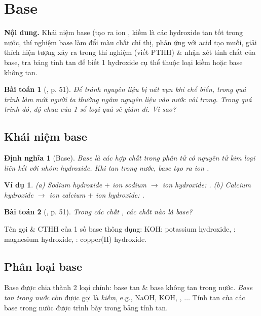 \documentclass{article}
\newtheorem{baitoan}{Bài toán}
\newtheorem{dinhnghia}{Định nghĩa}
\newtheorem{vidu}{Ví dụ}
\begin{document}

\section{Base}
\textsf{\textbf{Nội dung.} Khái niệm base (tạo ra ion , kiềm là các hydroxide tan tốt trong nước, thí nghiệm base làm đổi màu chất chỉ thị, phản ứng với acid tạo muối, giải thích hiện tượng xảy ra trong thí nghiệm (viết PTHH) \& nhận xét tính chất của base, tra bảng tính tan để biết 1 hydroxide cụ thể thuộc loại kiềm hoặc base không tan.}

\begin{baitoan}[\cite{SGK_KHTN_8_Canh_Dieu}, p. 51]
	Để tránh nguyên liệu bị nát vụn khi chế biến, trong quá trình làm mứt người ta thường ngâm nguyên liệu vào nước vôi trong. Trong quá trình đó, độ chua của 1 số loại quả sẽ giảm đi. Vì sao?
\end{baitoan}

\subsection{Khái niệm base}

\begin{dinhnghia}[Base]
	\emph{Base} là các hợp chất trong phân tử có nguyên tử kim loại liên kết với nhóm hydroxide. Khi tan trong nước, base tạo ra ion \emph{}.
\end{dinhnghia}

\begin{vidu}
	(a) Sodium hydroxide $+$ ion sodium $\to$ ion hydroxide: \emph{}. (b) Calcium hydroxide $\to$ ion calcium $+$ ion hydroxide: \emph{}.
\end{vidu}

\begin{baitoan}[\cite{SGK_KHTN_8_Canh_Dieu}, p. 51]
	Trong các chất \emph{}, các chất nào là base?
\end{baitoan}
Tên gọi \& CTHH của 1 số base thông dụng: KOH: potassium hydroxide, : magnesium hydroxide, : copper(II) hydroxide.

\subsection{Phân loại base}
Base được chia thành 2 loại chính: base tan \& base không tan trong nước. \textit{Base tan trong nước} còn được gọi là \textit{kiềm}, e.g., NaOH, KOH, , $\ldots$ Tính tan của các base trong nước được trình bày trong bảng tính tan.
\end{document}

